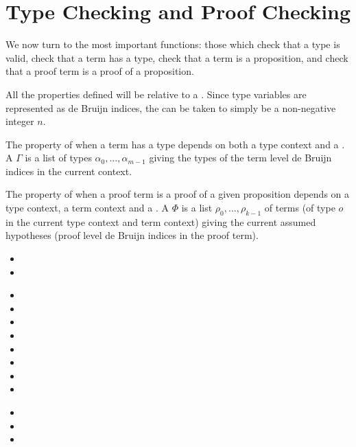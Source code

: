 \section{Type Checking and Proof Checking}

We now turn to the most important functions: those which check that a type
is valid, check that a term has a type, check that a term is a proposition,
and check that a proof term is a proof of a proposition.

All the properties defined will be relative to a
{}.
Since type variables are represented
as de Bruijn indices, the {}
can be taken to simply be a non-negative integer $n$.

The property of when a term has a type
depends on both a type context and a {}.
A {} $\Gamma$ is a list of types
$\alpha_0,\ldots,\alpha_{m-1}$
giving the types of the term level de Bruijn indices
in the current context.

The property of when a proof term is a proof of a given
proposition depends on a type context, a term context
and a {}.
A {} $\Phi$ is a list
$\rho_0,\ldots,\rho_{k-1}$
of terms (of type $o$ in the current type context
and term context)
giving the current assumed hypotheses
(proof level de Bruijn indices in the proof term).

\begin{itemize}
\item {}
\item {}
\end{itemize}

\begin{itemize}
\item {}
\item {}
\item {}
\item {}
\item {}
\item {}
\item {}
\item {}
\end{itemize}

\begin{itemize}
\item {}
\item {}
\item {}
\end{itemize}
